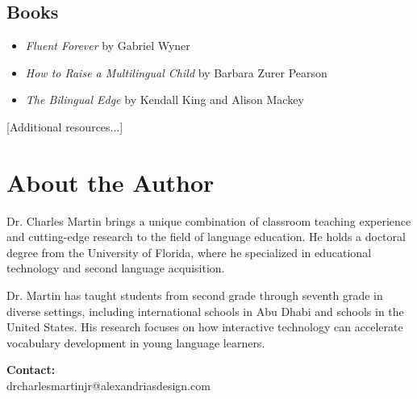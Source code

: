 \documentclass[11pt,oneside]{book}
\begin{document}
\section*{Books}
\begin{itemize}
\item \textit{Fluent Forever} by Gabriel Wyner
\item \textit{How to Raise a Multilingual Child} by Barbara Zurer Pearson
\item \textit{The Bilingual Edge} by Kendall King and Alison Mackey
\end{itemize}

[Additional resources...]

\chapter*{About the Author}

Dr. Charles Martin brings a unique combination of classroom teaching experience and cutting-edge research to the field of language education. He holds a doctoral degree from the University of Florida, where he specialized in educational technology and second language acquisition.

Dr. Martin has taught students from second grade through seventh grade in diverse settings, including international schools in Abu Dhabi and schools in the United States. His research focuses on how interactive technology can accelerate vocabulary development in young language learners.

\vspace{12pt}

\textbf{Contact:}\\
drcharlesmartinjr@alexandriasdesign.com

\end{document}
